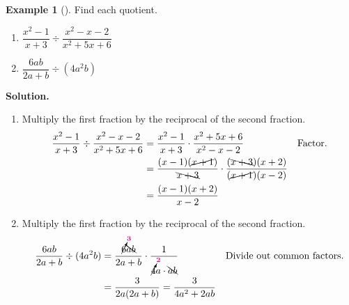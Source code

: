 \documentclass[10pt,]{book}
\theoremstyle{plain}
\theoremstyle{definition}
\theoremstyle{definition}
\newtheorem{example}[theorem]{Example}
\theoremstyle{definition}
\numberwithin{equation}{part}
\newcommand{\alert}[1]{\boldsymbol{\color{magenta}{#1}}}
\newcommand{\amp}{&}
\begin{document}
\begin{example}[]\label{example-60}
Find each quotient. \leavevmode%
\begin{enumerate}[label=*\alph**]
\item\hypertarget{li-299}{}\(\dfrac{x^2-1}{x+3}\div\dfrac{x^2-x-2}{x^2+5x+6}\)%
\item\hypertarget{li-300}{}\(\dfrac{6ab}{2a+b}\div(4a^2b)\)%
\end{enumerate}
%
\par\medskip\noindent%
\textbf{Solution.}\quad \leavevmode%
\begin{enumerate}[label=*\alph**]
\item\hypertarget{li-301}{}Multiply the first fraction by the reciprocal of the second fraction.%
\begin{align*}
\frac{x^2-1}{x+3}\div\frac{x^2-x-2}{x^2+5x+6}
\amp =\frac{x^2-1}{x+3}\cdot\frac{x^2+5x+6}{x^2-x-2} \amp\amp\text{Factor.}
\\
\amp = \frac{(x-1)(\cancel{x+1})}{\bcancel{x+3}}\cdot\frac{(\bcancel{x+3})(x+2)}{(\cancel{x+1})(x-2)}
\\
\amp = \frac{(x-1)(x+2)}{x-2}
\end{align*}
%
\item\hypertarget{li-302}{}Multiply the first fraction by the reciprocal of the second fraction.%
\begin{align*}
\frac{6ab}{2a+b}\div(4a^2b) \amp =\frac{\cancelto{\alert{3}}{6}\bcancel{ab}}{2a+b}\cdot\frac{1}{\cancelto{\alert{2}}{4}a\cdot\bcancel{ab}}
\amp\amp\text{Divide out common factors.}
\\
\amp = \frac{3}{2a(2a+b)}=\frac{3}{4a^2+2ab}
\end{align*}
%
\end{enumerate}
%
\end{example}
\typeout{************************************************}
\typeout{************************************************}
\end{document}
